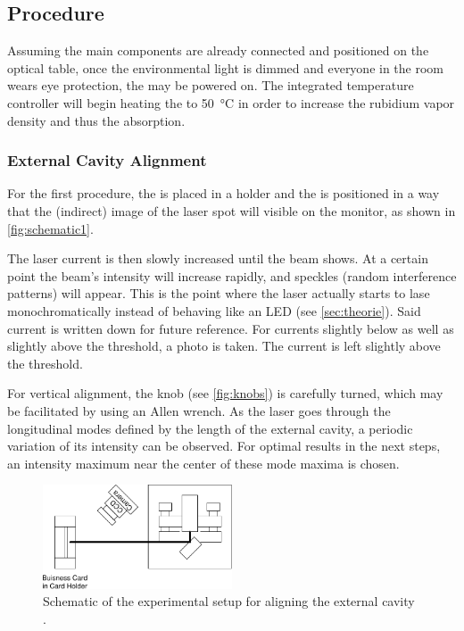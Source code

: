 \subsection{Procedure}
    Assuming the main components are already connected and positioned on the optical table,
once the environmental light is dimmed and everyone in the room wears eye protection,
the  may be powered on.
The integrated temperature controller will begin heating the  to \SI{50}{\celsius}
in order to increase the rubidium vapor density and thus the absorption.


\subsubsection{External Cavity Alignment}
For the first procedure,
the  is placed in a holder
and the  is positioned in a way that the (indirect) image of the laser spot will visible on the monitor,
as shown in \autoref{fig:schematic1}.

The laser current is then slowly increased until the beam shows.
At a certain point the beam's intensity will increase rapidly,
and speckles (random interference patterns) will appear.
This is the point where the laser actually starts to lase monochromatically instead of behaving like an LED (see \autoref{sec:theorie}). %
Said current is written down for future reference.
For currents slightly below as well as slightly above the threshold,
a photo is taken.
The current is left slightly above the threshold.

For vertical alignment, the  knob (see \autoref{fig:knobs}) is carefully turned,
which may be facilitated by using an Allen wrench.
As the laser goes through the longitudinal modes defined by the length of the external cavity,
a periodic variation of its intensity can be observed.
For optimal results in the next steps,
an intensity maximum near the center of these mode maxima is chosen.


\begin{figure}
    \centering
    \includegraphics[width=0.5\textwidth]{content/img/p30_Fig1.pdf}
    \caption{Schematic of the experimental setup for aligning the external cavity \cite{versuchsanleitung}.}
    \label{fig:schematic1}
\end{figure}

